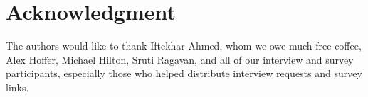\section*{Acknowledgment}

The authors would like to thank Iftekhar Ahmed, whom we owe much free coffee, Alex Hoffer, Michael Hilton, Sruti Ragavan, and all of our interview and survey participants, especially those who helped distribute interview requests and survey links.
